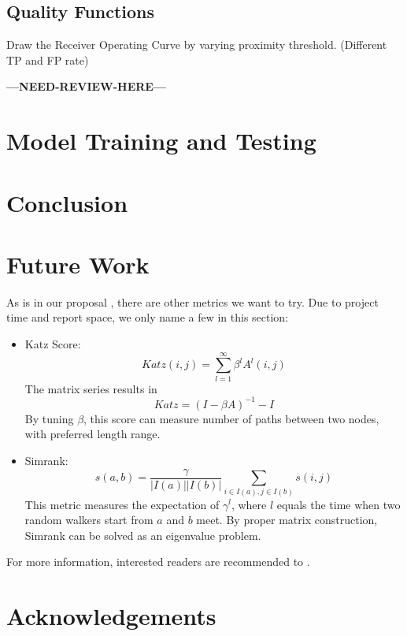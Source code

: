 \documentclass[11pt,a4paper]{article}
\newcommand{\question}{\textbf{---NEED-REVIEW-HERE---}}
\begin{document}
\subsection{Quality Functions}

Draw the Receiver Operating Curve by varying proximity threshold. 
			(Different TP and FP rate)
			

\question


\section{Model Training and Testing}


\section{Conclusion}


\section{Future Work}

As is in our proposal \cite{hu2011-cd2hop}, there are other metrics
we want to try. Due to project time and report space, we only name 
a few in this section:
\begin{itemize}
	\item Katz Score:
			\begin{equation}
				Katz(i,j)=\sum_{l=1}^{\infty}{\beta^lA^l(i,j)}
			\end{equation}
			The matrix series results in 
			\begin{equation}
				Katz = (I-\beta A)^{-1} - I
			\end{equation}
			By tuning $\beta$, this score can measure number of paths between 
			two nodes, with preferred length range. 
	\item Simrank:
			\begin{equation}
				s(a,b)=\frac{\gamma}{|I(a)||I(b)|}
				\sum_{i \in I(a), j \in I(b)} s(i,j)
			\end{equation}
			This metric measures the expectation of $\gamma^l$, where $l$ equals 
			the time when two random walkers start from $a$ and $b$ meet. By proper 
			matrix construction, Simrank can be solved as an eigenvalue problem. 
\end{itemize}
For more information, interested readers are recommended to \cite{aggarwal2011social}. 



\section*{Acknowledgements}
\end{document}
